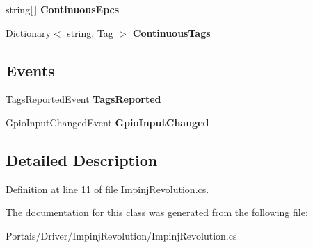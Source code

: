 \begin{DoxyCompactItemize}
\item 
string\mbox{[}$\,$\mbox{]} {\bfseries Continuous\+Epcs}\hypertarget{class_portais_1_1_driver_1_1_impinj_revolution_1_1_impinj_revolution_aa7e78ec2cbc5ef646ed7fcfa7ab505be}{}\label{class_portais_1_1_driver_1_1_impinj_revolution_1_1_impinj_revolution_aa7e78ec2cbc5ef646ed7fcfa7ab505be}

\item 
Dictionary$<$ string, Tag $>$ {\bfseries Continuous\+Tags}\hypertarget{class_portais_1_1_driver_1_1_impinj_revolution_1_1_impinj_revolution_aba50e691f62ee73aa716c309319960e6}{}\label{class_portais_1_1_driver_1_1_impinj_revolution_1_1_impinj_revolution_aba50e691f62ee73aa716c309319960e6}

\end{DoxyCompactItemize}
\subsection*{Events}
\begin{DoxyCompactItemize}
\item 
Tags\+Reported\+Event {\bfseries Tags\+Reported}\hypertarget{class_portais_1_1_driver_1_1_impinj_revolution_1_1_impinj_revolution_aff937806286c3903821ff2f0ba3a5c16}{}\label{class_portais_1_1_driver_1_1_impinj_revolution_1_1_impinj_revolution_aff937806286c3903821ff2f0ba3a5c16}

\item 
Gpio\+Input\+Changed\+Event {\bfseries Gpio\+Input\+Changed}\hypertarget{class_portais_1_1_driver_1_1_impinj_revolution_1_1_impinj_revolution_ae52df9c27eaab592a9a716647cdf6b3b}{}\label{class_portais_1_1_driver_1_1_impinj_revolution_1_1_impinj_revolution_ae52df9c27eaab592a9a716647cdf6b3b}

\end{DoxyCompactItemize}


\subsection{Detailed Description}


Definition at line 11 of file Impinj\+Revolution.\+cs.



The documentation for this class was generated from the following file\+:\begin{DoxyCompactItemize}
\item 
Portais/\+Driver/\+Impinj\+Revolution/Impinj\+Revolution.\+cs\end{DoxyCompactItemize}
